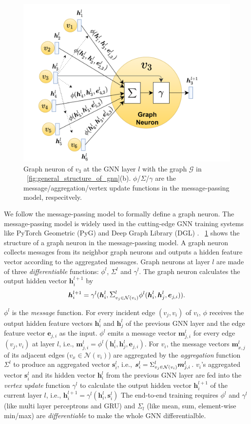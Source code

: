 \begin{figure}
	\centering
	\includegraphics[width=0.5\columnwidth]{figs/illustration/GNN_Unit.png}
	\caption{Graph neuron of $v_3$ at the GNN layer $l$ with the graph $\mathcal{G}$ in \figurename~\ref{fig:general_structure_of_gnn}(b). $\phi$/$\Sigma$/$\gamma$ are the message/aggregation/vertex update functions in the message-passing model, respecitvely.}
	\label{fig:graph_neuron_structure}
\end{figure}

We follow the message-passing model \cite{gilmer_messgae_passing} to formally define a graph neuron.
The message-passing model is widely used in the cutting-edge GNN training systems like PyTorch Geometric (PyG) \cite{PyG} and Deep Graph Library (DGL) \cite{DGL}.
\figurename~\ref{fig:graph_neuron_structure} shows the structure of a graph neuron in the message-passing model.
A graph neuron collects messages from its neighbor graph neurons and outputs a hidden feature vector according to the aggregated messages.
Graph neurons at layer $l$ are made of three \emph{differentiable} functions: $\phi^l$, $\Sigma^l$ and $\gamma^l$.
The graph neuron calculates the output hidden vector $\boldsymbol{h}^{l+1}_i$ by
$$
	\boldsymbol{h}^{l+1}_i = \gamma^l(\boldsymbol{h}^l_i, \mathlarger{\Sigma}^l_{v_j \in \mathcal{N}(v_i)}{\phi^l(\boldsymbol{h}^l_i, \boldsymbol{h}^l_j,	\boldsymbol{e}_{j,i})}).
$$

$\phi^l$ is the \emph{message} function.
For every incident edge $(v_j, v_i)$ of $v_i$, $\phi$ receives the output hidden feature vectors $\boldsymbol{h}^l_i$ and $\boldsymbol{h}^l_j$ of the previous GNN layer and the edge feature vector $\boldsymbol{e}_{j,i}$ as the input.
$\phi^l$ emits a message vector $\boldsymbol{m}^l_{j,i}$ for every edge $(v_j, v_i)$ at layer $l$, i.e., $\boldsymbol{m}^l_{j,i}=\phi^l(\boldsymbol{h}^l_i, \boldsymbol{h}^l_j, \boldsymbol{e}_{j,i})$.
For $v_i$, the message vectors $\boldsymbol{m}^l_{x,j}$ of its adjacent edges ($v_x \in \mathcal{N}(v_i)$) are aggregated by the \emph{aggregation} function $\Sigma^l$ to produce an aggregated vector $\boldsymbol{s}^l_i$, i.e., $\boldsymbol{s}^l_i=\mathlarger{\Sigma}^l_{v_j \in \mathcal{N}(v_i)}\boldsymbol{m}^l_{j,i}$.
$v_i$'s aggregated vector $\boldsymbol{s}^l_i$ and its hidden vector $\boldsymbol{h}^l_i$ from the previous GNN layer are fed into the \emph{vertex update} function $\gamma^l$ to calculate the output hidden vector $\boldsymbol{h}^{l+1}_i$ of the current layer $l$, i.e., $\boldsymbol{h}^{l+1}_i = \gamma^l(\boldsymbol{h}^l_i, \boldsymbol{s}^l_i)$
The end-to-end training requires $\phi^l$ and $\gamma^l$ (like multi layer perceptrons and GRU) and $\Sigma_l$ (like mean, sum, element-wise min/max) are \emph{differentiable} to make the whole GNN differentialble.

